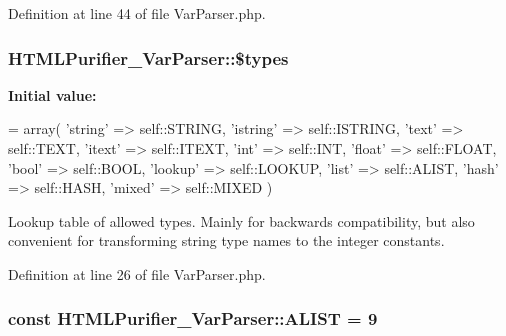 Definition at line 44 of file Var\+Parser.\+php.

\hypertarget{classHTMLPurifier__VarParser_ad68cf831a2223db6a6d144226b52cc09}{
\subsubsection[{\$types}]{\setlength{\rightskip}{0pt plus 5cm}H\+T\+M\+L\+Purifier\+\_\+\+Var\+Parser\+::\$types\hspace{0.3cm}{\ttfamily [static]}}}\label{classHTMLPurifier__VarParser_ad68cf831a2223db6a6d144226b52cc09}
{\bfseries Initial value\+:}
\begin{DoxyCode}
= array(
        \textcolor{stringliteral}{'string'}    => self::STRING,
        \textcolor{stringliteral}{'istring'}   => self::ISTRING,
        \textcolor{stringliteral}{'text'}      => self::TEXT,
        \textcolor{stringliteral}{'itext'}     => self::ITEXT,
        \textcolor{stringliteral}{'int'}       => self::INT,
        \textcolor{stringliteral}{'float'}     => self::FLOAT,
        \textcolor{stringliteral}{'bool'}      => self::BOOL,
        \textcolor{stringliteral}{'lookup'}    => self::LOOKUP,
        \textcolor{stringliteral}{'list'}      => self::ALIST,
        \textcolor{stringliteral}{'hash'}      => self::HASH,
        \textcolor{stringliteral}{'mixed'}     => self::MIXED
    )
\end{DoxyCode}
Lookup table of allowed types. Mainly for backwards compatibility, but also convenient for transforming string type names to the integer constants. 

Definition at line 26 of file Var\+Parser.\+php.

\hypertarget{classHTMLPurifier__VarParser_a3903ff9322140086ac0b88034ec67eed}{
\subsubsection[{A\+L\+I\+S\+T}]{\setlength{\rightskip}{0pt plus 5cm}const H\+T\+M\+L\+Purifier\+\_\+\+Var\+Parser\+::\+A\+L\+I\+S\+T = 9}}\label{classHTMLPurifier__VarParser_a3903ff9322140086ac0b88034ec67eed}


